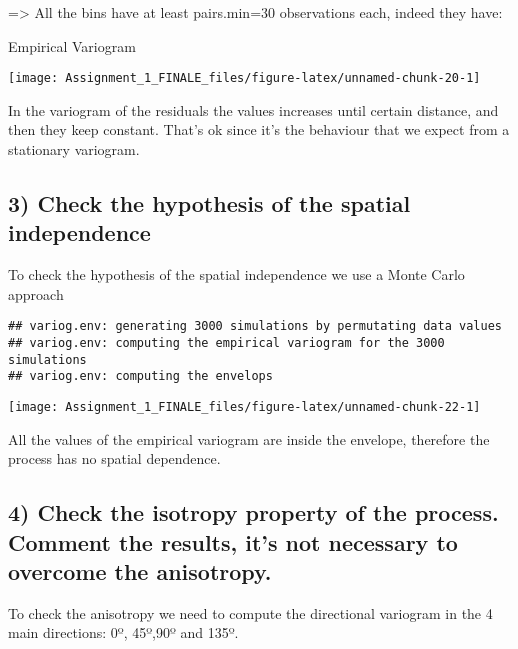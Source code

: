 \documentclass[
]{article}
\begin{document}
=\textgreater{} All the bins have at least pairs.min=30 observations
each, indeed they have:

Empirical Variogram

\begin{center}\texttt{[image: Assignment\_1\_FINALE\_files/figure-latex/unnamed-chunk-20-1]} \end{center}

In the variogram of the residuals the values increases until certain
distance, and then they keep constant. That's ok since it's the
behaviour that we expect from a stationary variogram.

\newpage

\hypertarget{check-the-hypothesis-of-the-spatial-independence}{%
\subsection{3) Check the hypothesis of the spatial
independence}\label{check-the-hypothesis-of-the-spatial-independence}}

To check the hypothesis of the spatial independence we use a Monte Carlo
approach

\begin{verbatim}
## variog.env: generating 3000 simulations by permutating data values
## variog.env: computing the empirical variogram for the 3000 simulations
## variog.env: computing the envelops
\end{verbatim}

\begin{center}\texttt{[image: Assignment\_1\_FINALE\_files/figure-latex/unnamed-chunk-22-1]} \end{center}

All the values of the empirical variogram are inside the envelope,
therefore the process has no spatial dependence.

\newpage

\hypertarget{check-the-isotropy-property-of-the-process.-comment-the-results-its-not-necessary-to-overcome-the-anisotropy.}{%
\subsection{4) Check the isotropy property of the process. Comment the
results, it's not necessary to overcome the
anisotropy.}\label{check-the-isotropy-property-of-the-process.-comment-the-results-its-not-necessary-to-overcome-the-anisotropy.}}

To check the anisotropy we need to compute the directional variogram in
the 4 main directions: 0º, 45º,90º and 135º.
\end{document}
